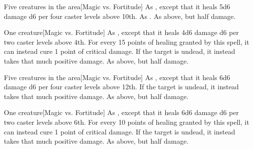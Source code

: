 \spellrng{\rngclose}
\begin{spelltargets}{Five creatures in the area}[Magic vs. Fortitude]
    \spelleffect As , except that it heals 5d6 damage \add d6 per four caster levels above 10th.
    \spellsuccess As .
    \spellfailure As above, but half damage.
\end{spelltargets}

\spellrng{\rngclose}
\begin{spelltarget}{One creature}[Magic vs. Fortitude]
    \spelleffect As , except that it heals 4d6 damage \add d6 per two caster levels above 4th. For every 15 points of healing granted by this spell, it can instead cure 1 point of critical damage.
    \spellsuccess If the target is undead, it instead takes that much positive damage.
    \spellfailure As above, but half damage.
\end{spelltarget}

\begin{spelltargets}{Five creatures in the area}[Magic vs. Fortitude]
    \spelleffect As , except that it heals 6d6 damage \add d6 per four caster levels above 12th.
    \spellsuccess If the target is undead, it instead takes that much positive damage.
    \spellfailure As above, but half damage.
\end{spelltargets}

\spellrng{\rngclose}
\begin{spelltarget}{One creature}[Magic vs. Fortitude]
    \spelleffect As , except that it heals 6d6 damage \add d6 per two caster levels above 6th. For every 10 points of healing granted by this spell, it can instead cure 1 point of critical damage.
    \spellsuccess If the target is undead, it instead takes that much positive damage.
    \spellfailure As above, but half damage.
\end{spelltarget}

